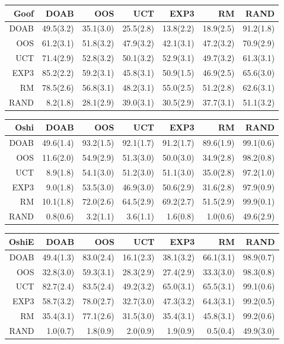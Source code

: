 \begin{figure}
\centering
\begin{scriptsize}
\begin{tabular}{|r|rrrrrr|}\hline
Goof&DOAB&OOS&UCT&EXP3&RM&RAND\\\hline
DOAB&49.5(3.2)&35.1(3.0)&25.5(2.8)&13.8(2.2)&18.9(2.5)&91.2(1.8)\\
OOS&61.2(3.1)&51.8(3.2)&47.9(3.2)&42.1(3.1)&47.2(3.2)&70.9(2.9)\\
UCT&71.4(2.9)&52.8(3.2)&50.1(3.2)&52.9(3.1)&49.7(3.2)&61.3(3.1)\\
EXP3&85.2(2.2)&59.2(3.1)&45.8(3.1)&50.9(1.5)&46.9(2.5)&65.6(3.0)\\
RM&78.5(2.6)&56.8(3.1)&48.2(3.1)&55.0(2.5)&51.2(2.8)&62.6(3.1)\\
RAND&8.2(1.8)&28.1(2.9)&39.0(3.1)&30.5(2.9)&37.7(3.1)&51.1(3.2)\\
\hline
\end{tabular}


\begin{tabular}{|r|rrrrrr|}\hline
Oshi&DOAB&OOS&UCT&EXP3&RM&RAND\\\hline
DOAB&49.6(1.4)&93.2(1.5)&92.1(1.7)&91.2(1.7)&89.6(1.9)&99.1(0.6)\\
OOS&11.6(2.0)&54.9(2.9)&51.3(3.0)&50.0(3.0)&34.9(2.8)&98.2(0.8)\\
UCT&8.9(1.8)&54.1(3.0)&51.2(3.0)&51.1(3.0)&35.0(2.8)&97.2(1.0)\\
EXP3&9.0(1.8)&53.5(3.0)&46.9(3.0)&50.6(2.9)&31.6(2.8)&97.9(0.9)\\
RM&10.1(1.8)&72.0(2.6)&64.5(2.9)&69.2(2.7)&51.5(2.9)&99.9(0.1)\\
RAND&0.8(0.6)&3.2(1.1)&3.6(1.1)&1.6(0.8)&1.0(0.6)&49.6(2.9)\\
\hline
\end{tabular}

\begin{tabular}{|r|rrrrrr|}\hline
OshiE&DOAB&OOS&UCT&EXP3&RM&RAND\\\hline
DOAB&49.4(1.3)&83.0(2.4)&16.1(2.3)&38.1(3.2)&66.1(3.1)&98.9(0.7)\\
OOS&32.8(3.0)&59.3(3.1)&28.3(2.9)&27.4(2.9)&33.3(3.0)&98.3(0.8)\\
UCT&82.7(2.4)&83.5(2.4)&49.2(3.2)&65.0(3.1)&65.5(3.1)&99.1(0.6)\\
EXP3&58.7(3.2)&78.0(2.7)&32.7(3.0)&47.3(3.2)&64.3(3.1)&99.2(0.5)\\
RM&35.4(3.1)&77.1(2.6)&31.5(3.0)&35.4(3.1)&45.8(3.1)&99.2(0.6)\\
RAND&1.0(0.7)&1.8(0.9)&2.0(0.9)&1.9(0.9)&0.5(0.4)&49.9(3.0)\\
\hline
\end{tabular}


\end{scriptsize}
\end{figure}
